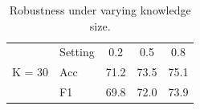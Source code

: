 \begin{table}[t]
\centering
\caption{Robustness under varying knowledge size.}
\label{tab:multirow}
\begin{tabular}{llccc}
\toprule
\multirow{7}{*}{K = 30} & Setting & 0.2 & 0.5 & 0.8 \\
 & Acc & 71.2 & 73.5 & 75.1 \\
 & F1 & 69.8 & 72.0 & 73.9 \\
\bottomrule
\end{tabular}
\end{table}
